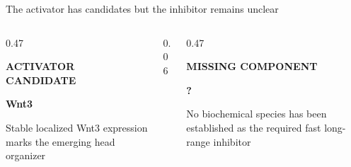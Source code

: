 \begin{frame}{The activator has candidates but the inhibitor remains unclear}

  \vspace{-0.12cm}

  \begin{columns}[c,onlytextwidth]
    \begin{column}{0.47\textwidth}
      \centering
      {\color{HydraGold}\bfseries\fontsize{8}{9.5}\selectfont
        ACTIVATOR CANDIDATE\par}
      \vspace{0.22cm}
      {\color{HydraWhite}\bfseries\fontsize{21}{24}\selectfont Wnt3\par}
      \vspace{0.22cm}
      {\color{HydraMuted}\fontsize{7.5}{9.2}\selectfont
        Stable localized Wnt3 expression marks the emerging head organizer
      \par}
    \end{column}

    \begin{column}{0.06\textwidth}
      \centering{\color{HydraLine}\fontsize{28}{28}\selectfont $\vert$}
    \end{column}

    \begin{column}{0.47\textwidth}
      \centering
      {\color{HydraCyan}\bfseries\fontsize{8}{9.5}\selectfont
        MISSING COMPONENT\par}
      \vspace{0.22cm}
      {\color{HydraWhite}\bfseries\fontsize{18}{22}\selectfont ?\par}
      \vspace{0.22cm}
      {\color{HydraMuted}\fontsize{7.5}{9.2}\selectfont
        No biochemical species has been established as the required fast long-range inhibitor
      \par}
    \end{column}
  \end{columns}

  \vspace{0.48cm}


\end{frame}
